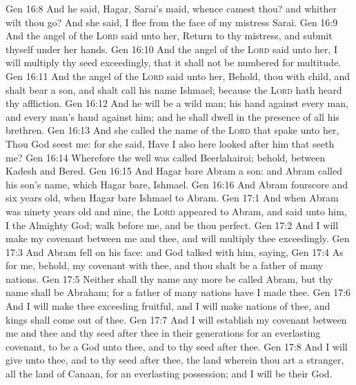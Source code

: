 \vs Gen 16:8 And he said, Hagar, Sarai's maid, whence camest thou? and whither wilt thou go? And she said, I flee from the face of my mistress Sarai.
\vs Gen 16:9 And the angel of the \textsc{Lord} said unto her, Return to thy mistress, and submit thyself under her hands.
\vs Gen 16:10 And the angel of the \textsc{Lord} said unto her, I will multiply thy seed exceedingly, that it shall not be numbered for multitude.
\vs Gen 16:11 And the angel of the \textsc{Lord} said unto her, Behold, thou  with child, and shalt bear a son, and shalt call his name Ishmael; because the \textsc{Lord} hath heard thy affliction.
\vs Gen 16:12 And he will be a wild man; his hand  against every man, and every man's hand against him; and he shall dwell in the presence of all his brethren.
\vs Gen 16:13 And she called the name of the \textsc{Lord} that spake unto her, Thou God seest me: for she said, Have I also here looked after him that seeth me?
\vs Gen 16:14 Wherefore the well was called Beerlahairoi; behold,  between Kadesh and Bered.
\vs Gen 16:15 And Hagar bare Abram a son: and Abram called his son's name, which Hagar bare, Ishmael.
\vs Gen 16:16 And Abram  fourscore and six years old, when Hagar bare Ishmael to Abram.
\vs Gen 17:1 And when Abram was ninety years old and nine, the \textsc{Lord} appeared to Abram, and said unto him, I  the Almighty God; walk before me, and be thou perfect.
\vs Gen 17:2 And I will make my covenant between me and thee, and will multiply thee exceedingly.
\vs Gen 17:3 And Abram fell on his face: and God talked with him, saying,
\vs Gen 17:4 As for me, behold, my covenant  with thee, and thou shalt be a father of many nations.
\vs Gen 17:5 Neither shall thy name any more be called Abram, but thy name shall be Abraham; for a father of many nations have I made thee.
\vs Gen 17:6 And I will make thee exceeding fruitful, and I will make nations of thee, and kings shall come out of thee.
\vs Gen 17:7 And I will establish my covenant between me and thee and thy seed after thee in their generations for an everlasting covenant, to be a God unto thee, and to thy seed after thee.
\vs Gen 17:8 And I will give unto thee, and to thy seed after thee, the land wherein thou art a stranger, all the land of Canaan, for an everlasting possession; and I will be their God.

